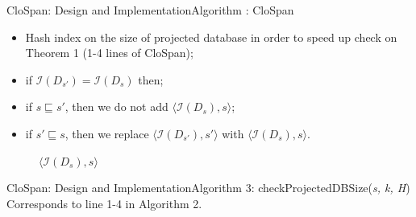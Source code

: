 \documentclass[12pt]{beamer}
\begin{document}
\begin{frame}{CloSpan: Design and Implementation}{Algorithm : CloSpan}
\begin{itemize}
\item Hash index on the size of projected database in order to speed up check on Theorem 1 (1-4 lines of CloSpan);
\item if $\mathcal{I}(D_{s'}) = \mathcal{I}(D_s)$ then;
\item if $s \sqsubseteq s'$, then we do not add $\langle \mathcal{I}(D_s),s \rangle$;
\item if $s' \sqsubseteq s$, then we replace $\langle \mathcal{I}(D_{s'}),s' \rangle$ with $\langle \mathcal{I}(D_s),s \rangle$.
\end{itemize}
\begin{figure}
\caption*{$\langle \mathcal{I}(D_s),s \rangle$}
\end{figure}
\end{frame}

\begin{frame}{CloSpan: Design and Implementation}{Algorithm 3: checkProjectedDBSize({\it s, k, H})}
Corresponds to line 1-4 in Algorithm 2.
\begin{figure}
\end{figure}
\end{frame}
\end{document}
